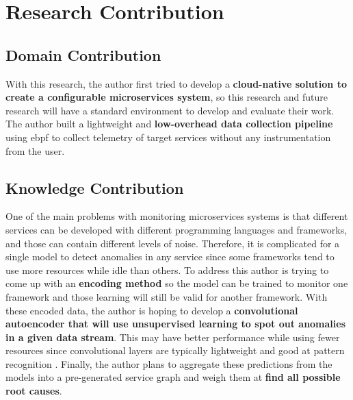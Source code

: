 \section{Research Contribution}


\subsection{Domain Contribution}

With this research, the author first tried to develop a \textbf{cloud-native solution to create a configurable microservices system}, so this research and future research will have a standard environment to develop and evaluate their work. The author built a lightweight and \textbf{low-overhead data collection pipeline} using \ac{ebpf} to collect telemetry of target services without any instrumentation from the user.

\subsection{Knowledge Contribution}

One of the main problems with monitoring microservices systems is that different services can be developed with different programming languages and frameworks, and those can contain different levels of noise\label{need-for-encoding}. Therefore, it is complicated for a single model to detect anomalies in any service since some frameworks tend to use more resources while idle than others. To address this author is trying to come up with an \textbf{encoding method} so the model can be trained to monitor one framework and those learning will still be valid for another framework. With these encoded data, the author is hoping to develop a \textbf{convolutional autoencoder that will use unsupervised learning to spot out anomalies in a given data stream}. This may have better performance while using fewer resources since convolutional layers are typically lightweight and good at pattern recognition \citep{oord2016wavenet}. Finally, the author plans to aggregate these predictions from the models into a pre-generated service graph and weigh them at \textbf{find all possible root causes}.
